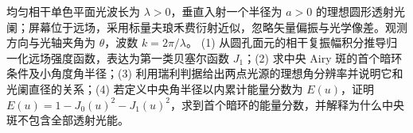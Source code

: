 均匀相干单色平面光波长为 \(\lambda>0\)，垂直入射一个半径为 \(a>0\) 的理想圆形透射光阑；屏幕位于远场，采用标量夫琅禾费衍射近似，忽略矢量偏振与光学像差。观测方向与光轴夹角为 \(\theta\)，波数 \(k=2\pi/\lambda\)。
(1) 从圆孔面元的相干复振幅积分推导归一化远场强度函数，表达为第一类贝塞尔函数 \(J_1\)；(2) 求中央 Airy 斑的首个暗环条件及小角度角半径；(3) 利用瑞利判据给出两点光源的理想角分辨率并说明它和光阑直径的关系；(4) 若定义中央角半径以内累计能量分数为 \(E(u)\)，证明 \(E(u)=1-J_0(u)^2-J_1(u)^2\)，求到首个暗环的能量分数，并解释为什么中央斑不包含全部透射光能。
